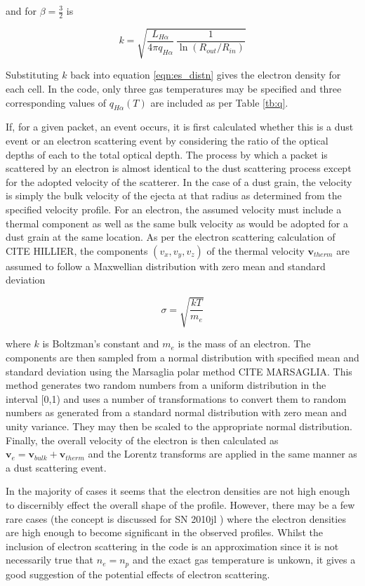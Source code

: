 and for $\beta=\frac{3}{2}$ is

\begin{equation}
\label{eqn:kcalc2}
k= \sqrt{\frac{L_{H\alpha}}{4 \pi q_{H\alpha}} ~\frac{1}{\ln({R_{out}/R_{in}})}}
\end{equation}

Substituting $k$ back into equation \ref{eqn:es_distn} gives the electron density for each cell.  In the code, only three gas temperatures may be specified and three corresponding values of $q_{H\alpha}(T)$ are included as per Table \ref{tb:q}.


	If, for a given packet, an event occurs, it is first calculated whether this is a dust event or an electron scattering event by considering the ratio of the optical depths of each to the total optical depth.  The process by which a packet is scattered by an electron is almost identical to the dust scattering process except for the adopted velocity of the scatterer.  In the case of a dust grain, the velocity is simply the bulk velocity of the ejecta at that radius as determined from the specified velocity profile.  For an electron, the assumed velocity must include a thermal component as well as the same bulk velocity as would be adopted for a dust grain at the same location.  As per the electron scattering calculation of CITE HILLIER, the components $(v_x,v_y,v_z)$ of the thermal velocity $\boldsymbol{v}_{therm}$ are assumed to follow a Maxwellian distribution with zero mean and standard deviation 

		\begin{equation}
		\label{eqn:sigma_maxwell}
		\sigma=\sqrt{\frac{kT}{m_e}}
		\end{equation}

\noindent where $k$ is Boltzman's constant and $m_e$ is the mass of an electron.  The components are then sampled from a normal distribution with specified mean and standard deviation using the Marsaglia polar method CITE MARSAGLIA.  This method generates two random numbers from a uniform distribution in the interval [0,1) and uses a number of transformations to convert them to random numbers as generated from a standard normal distribution with zero mean and unity variance.  They may then be scaled to the appropriate normal distribution.  Finally, the overall velocity of the electron is then calculated as $\boldsymbol{v}_e=\boldsymbol{v}_{bulk}+\boldsymbol{v}_{therm}$ and the Lorentz transforms are applied in the same manner as a dust scattering event.

In the majority of cases it seems that the electron densities are not high enough to discernibly effect the overall shape of the profile.  However, there may be a few rare cases (the concept is discussed for SN 2010jl \citep{Fransson2013}) where the electron densities are high enough to become significant in the observed profiles.  Whilst the inclusion of electron scattering in the code is an approximation since it is not necessarily true that $n_e=n_p$ and the exact gas temperature is unkown, it gives a good suggestion of the potential effects of electron scattering.	
	
